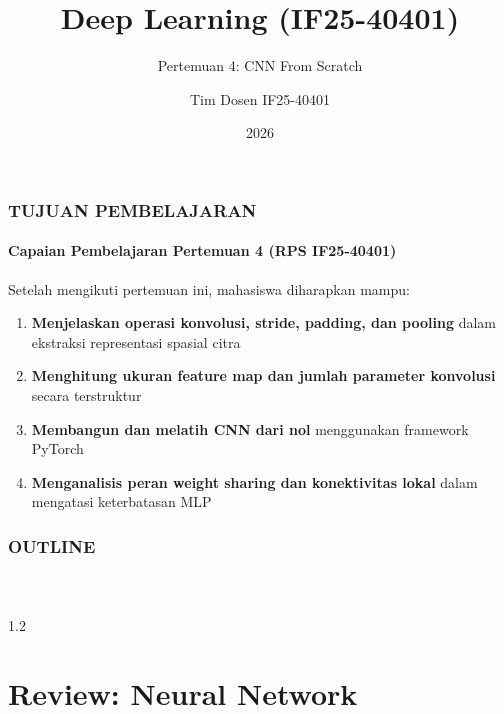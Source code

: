 \documentclass[t,aspectratio=169,xcolor=dvipsnames]{beamer}
\title[short title]{Deep Learning (IF25-40401)}
\subtitle{Pertemuan 4: CNN From Scratch}
\author[Surname]{Tim Dosen IF25-40401}
\institute[CBI]{Teknik Informatika \\ Institut Teknologi Sumatera}
\date{\textcolor{nyublue}{2026}}
\begin{document}
\begin{frame}[plain]

    \titlepage
    
\end{frame}

\begin{frame}[plain]

    \frametitle{TUJUAN PEMBELAJARAN} 
    \framesubtitle{Capaian Pembelajaran Pertemuan 4 (RPS IF25-40401)}

    \begin{exampleblock}{Setelah mengikuti pertemuan ini, mahasiswa diharapkan mampu:}
        \begin{enumerate}
            \item \textbf{Menjelaskan operasi konvolusi, stride, padding, dan pooling} dalam ekstraksi representasi spasial citra
            \item \textbf{Menghitung ukuran feature map dan jumlah parameter konvolusi} secara terstruktur
            \item \textbf{Membangun dan melatih CNN dari nol} menggunakan framework PyTorch
            \item \textbf{Menganalisis peran weight sharing dan konektivitas lokal} dalam mengatasi keterbatasan MLP
        \end{enumerate}
    \end{exampleblock}
    
\end{frame}

\begin{frame}[plain]

    \frametitle{OUTLINE} 
    \framesubtitle{~}

    \begin{spacing}{1.2}
        \tableofcontents
    \end{spacing}
    
\end{frame}

\section{Review: Neural Network}
\end{document}
